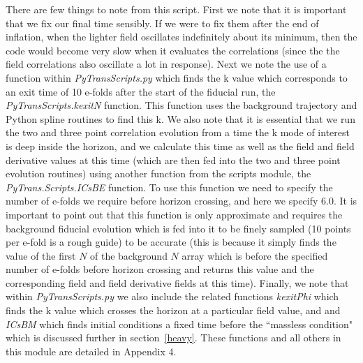 \documentclass[10pt,
amsmath,amssymb,
aps,prd,nofootinbib,eqsecnum,a4paper]{revtex4}
\begin{document}
There are few things to note from this script. First we note that 
it is important that we fix our final time sensibly. If we were to fix them after the end of inflation, when the lighter field 
oscillates indefinitely about its minimum, then the code would become very slow when it evaluates the 
correlations (since the the field correlations also oscillate a lot in 
response). Next we note the use of a function within {\it PyTransScripts.py} which 
finds the k value which corresponds to an exit time of 10 e-folds after the start of the fiducial run, the {\it PyTransScripts.kexitN} 
function. This function 
uses the background trajectory and Python spline routines to find this k.
We also note that it is essential that we run the two and three point correlation evolution 
from a time the k mode of interest is deep inside the horizon, and we calculate this time 
as well as the field and field derivative values at this time 
(which are then fed into the two and three point evolution routines) using another function from the 
scripts module, the {\it PyTrans.Scripts.ICsBE} function. 
To use this function we need to specify the number of e-folds we require before horizon crossing, and here we specify $6.0$. 
It is important to point out that this function is only approximate and requires 
the background fiducial evolution which is fed into it to be finely sampled 
(10 points per e-fold is a rough guide) to be accurate 
(this is because it simply finds the value of the first $N$ 
of the background $N$ array which is before the specified number of e-folds before horizon 
crossing and returns this value and the corresponding field and field derivative fields at this time). Finally, we note 
that within {\it PyTransScripts.py} we also include the related functions  {\it kexitPhi} which finds the k value which 
crosses the horizon at a particular field value, and and {\it ICsBM} which finds initial conditions a 
fixed time before the ``massless condition" which is discussed further in section~\ref{heavy}.  These functions 
and all others in this module are detailed in Appendix 4.
\end{document}
